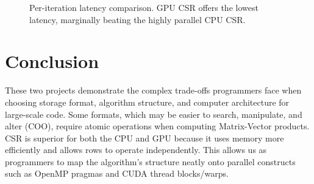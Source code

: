 \documentclass[11pt, letterpaper]{article}
\begin{document}
\begin{figure}[ht]
    \centering
    \caption{Per-iteration latency comparison. GPU CSR offers the lowest latency, marginally beating the highly parallel CPU CSR.}
    \label{fig:comparison}
\end{figure}

\section{Conclusion}
These two projects demonstrate the complex trade-offs programmers face when choosing storage format, algorithm structure, and computer architecture for large-scale code. Some formats, which may be easier to search, manipulate, and alter (COO), require atomic operations when computing Matrix-Vector products. CSR is superior for both the CPU and GPU because it uses memory more efficiently and allows rows to operate independently. This allows us as programmers to map the algorithm's structure neatly onto parallel constructs such as OpenMP pragmas and CUDA thread blocks/warps.
\end{document}

